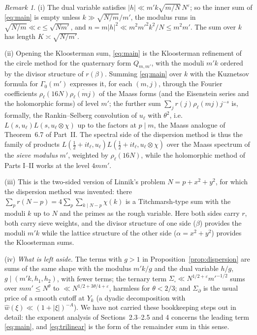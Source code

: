 \documentclass[11pt,a4paper]{article}
\theoremstyle{remark}
\newtheorem{remark}[theorem]{Remark}
\theoremstyle{definition}
\newcommand{\e}{\varepsilon}
\begin{document}
\begin{remark}
(i) The dual variable satisfies $|h|\ll m'k\sqrt{m/N}\,N^\e$; so the inner sum of \eqref{eq:main} is empty unless $k\gg\sqrt{N/m}/m'$, the modulus runs in $\sqrt{N/m}\ll c\le\sqrt{Nm'}$, and $n=m|h|^2\ll m^2m'^2k^2/N\le m^2m'$. The sum over $k$ has length $K\asymp\sqrt{N/m'}$.

(ii) Opening the Kloosterman sum, \eqref{eq:main} is the Kloosterman refinement of the circle method for the quaternary form $Q_{m,m'}$, with the moduli $m'k$ ordered by the divisor structure of $r(\beta)$. Summing \eqref{eq:main} over $k$ with the Kuznetsov formula for $\Gamma_0(m')$ expresses it, for each $(m,j)$, through the Fourier coefficients $\rho_\ell(16N)\overline{\rho_\ell(mj)}$ of the Maass forms (and the Eisenstein series and the holomorphic forms) of level $m'$; the further sum $\sum_jr(j)\rho_\ell(mj)j^{-s}$ is, formally, the Rankin--Selberg convolution of $u_\ell$ with $\theta^2$, i.e.\ $L(s,u_\ell)L(s,u_\ell\otimes\chi)$ up to the factors at $p\mid m$, the Maass analogue of Theorem~6.7 of Part~II. The spectral side of the dispersion method is thus the family of products $L(\tfrac12+it_\ell,u_\ell)L(\tfrac12+it_\ell,u_\ell\otimes\chi)$ over the Maass spectrum of the \emph{sieve modulus} $m'$, weighted by $\rho_\ell(16N)$, while the holomorphic method of Parts I--II works at the level $4mm'$.

(iii) This is the two-sided version of Linnik's problem $N=p+x^2+y^2$, for which the dispersion method was invented: there $\sum_pr(N-p)=4\sum_p\sum_{k\mid N-p}\chi(k)$ is a Titchmarsh-type sum with the moduli $k$ up to $N$ and the primes as the rough variable. Here both sides carry $r$, both carry sieve weights, and the divisor structure of one side ($\beta$) provides the moduli $m'k$ while the lattice structure of the other side ($\alpha=x^2+y^2$) provides the Kloosterman sums.

(iv) \emph{What is left aside.} The terms with $g>1$ in Proposition~\ref{prop:dispersion} are sums of the same shape with the modulus $m'k/g$ and the dual variable $h/g$, $g\mid(m'k,h_1,h_2)$, with fewer terms; the ternary term $\Sigma_\square\ll N^{1/2+\e}m'^{-1/2}$ sums over $mm'\le N^\theta$ to $\ll N^{1/2+3\theta/4+\e}$, harmless for $\theta<2/3$; and $\Sigma_\partial$ is the usual price of a smooth cutoff at $Y_k$ (a dyadic decomposition with $\hat w(\xi)\ll(1+|\xi|)^{-A}$). We have not carried these bookkeeping steps out in detail: the exponent analysis of Sections~2.3--2.5 and 4 concerns the leading term \eqref{eq:main}, and \eqref{eq:trilinear} is the form of the remainder sum in this sense.
\end{remark}
\end{document}
